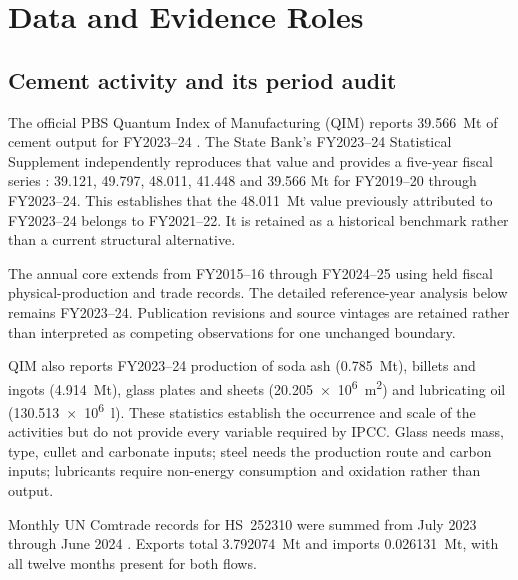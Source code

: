 \section{Data and Evidence Roles}
\label{sec:data}

\subsection{Cement activity and its period audit}

The official PBS Quantum Index of Manufacturing (QIM) reports
\SI{39.566}{\mega\tonne} of cement output for FY2023--24 \citep{pbsqim2024}. The State
Bank's FY2023--24 Statistical Supplement independently reproduces that value and provides a
five-year fiscal series \citep{sbpstatsupp2024}: 39.121, 49.797, 48.011, 41.448 and
39.566 Mt for FY2019--20 through FY2023--24. This establishes that the
\SI{48.011}{\mega\tonne} value previously attributed to FY2023--24 belongs to FY2021--22.
It is retained as a historical benchmark rather than a current structural alternative.

The annual core extends from FY2015--16 through FY2024--25 using held fiscal physical-production and trade records. The detailed reference-year analysis below remains FY2023--24. Publication revisions and source vintages are retained rather than interpreted as competing observations for one unchanged boundary.

QIM also reports FY2023--24 production of soda ash (\SI{0.785}{\mega\tonne}), billets and
ingots (\SI{4.914}{\mega\tonne}), glass plates and sheets
(\SI{20.205e6}{\metre\squared}) and lubricating oil
(\SI{130.513e6}{\litre}). These statistics establish the occurrence and scale of the
activities but do not provide every variable required by IPCC.
Glass needs mass, type, cullet and carbonate inputs; steel needs the production route and
carbon inputs; lubricants require non-energy consumption and oxidation rather than output.

Monthly UN Comtrade records for HS~252310 were summed from July 2023 through June 2024
\citep{uncomtrade2024clinker}. Exports total \SI{3.792074}{\mega\tonne} and imports
\SI{0.026131}{\mega\tonne}, with all twelve months present for both flows.

